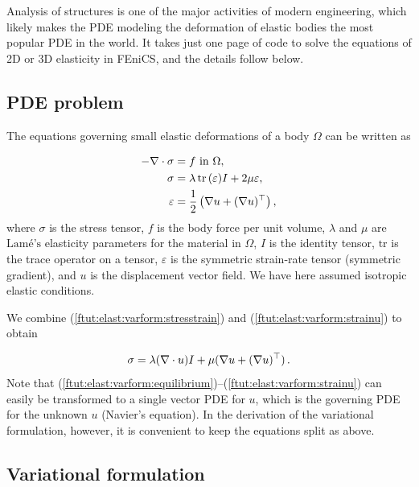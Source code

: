 \documentclass[graybox,envcountchap,sectrefs,final]{svmonodo}
\begin{document}

Analysis of structures is one of the major activities of modern
engineering, which likely makes the PDE modeling the deformation of
elastic bodies the most popular PDE in the world. It takes just one
page of code to solve the equations of 2D or 3D elasticity in FEniCS,
and the details follow below.

\subsection{PDE problem}


The equations governing small elastic deformations of a body $\Omega$
can be written as

\begin{align}
-\nabla\cdot\sigma &= f\hbox{ in }\Omega,
\label{ftut:elast:varform:equilibrium}\\
\sigma &= \lambda\,\hbox{tr}\,(\varepsilon) I + 2\mu\varepsilon,
\label{ftut:elast:varform:stresstrain}\\
\varepsilon &= \frac{1}{2}\left(\nabla u + (\nabla u)^{\top}\right),
\label{ftut:elast:varform:strainu}
\end{align}
where $\sigma$ is the stress tensor, $f$ is the body force per unit
volume, $\lambda$ and $\mu$ are $\text{Lam\'e's}$ elasticity parameters for the
material in $\Omega$, $I$ is the identity tensor, $\mathrm{tr}$ is the
trace operator on a tensor, $\varepsilon$ is the symmetric strain-rate
tensor (symmetric gradient), and $u$ is the displacement vector field.
We have here assumed isotropic elastic conditions.

We combine (\ref{ftut:elast:varform:stresstrain}) and
(\ref{ftut:elast:varform:strainu}) to obtain

\begin{equation}
\sigma = \lambda(\nabla\cdot u)I + \mu(\nabla u + (\nabla u)^{\top})\tp
\label{ftut:elast:varform:stressu}
\end{equation}
Note that
(\ref{ftut:elast:varform:equilibrium})--(\ref{ftut:elast:varform:strainu})
can easily be transformed to a single vector PDE for $u$, which is the
governing PDE for the unknown $u$ (Navier's equation).  In the
derivation of the variational formulation, however, it is convenient
to keep the equations split as above.

\subsection{Variational formulation}
\label{ftut:elast:varform}
\end{document}
